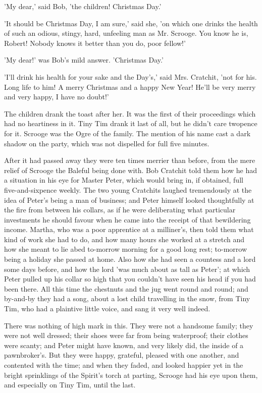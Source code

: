 'My dear,' said Bob, 'the children! Christmas Day.'

'It should be Christmas Day, I am sure,' said she, 'on which one drinks
the health of such an odious, stingy, hard, unfeeling man as Mr.
Scrooge. You know he is, Robert! Nobody knows it better than you do,
poor fellow!'

'My dear!' was Bob's mild answer. 'Christmas Day.'

'I'll drink his health for your sake and the Day's,' said Mrs. Cratchit,
'not for his. Long life to him! A merry Christmas and a happy New Year!
He'll be very merry and very happy, I have no doubt!'

The children drank the toast after her. It was the first of their
proceedings which had no heartiness in it. Tiny Tim drank it last of
all, but he didn't care twopence for it. Scrooge was the Ogre of the
family. The mention of his name cast a dark shadow on the party, which
was not dispelled for full five minutes.

After it had passed away they were ten times merrier than before, from
the mere relief of Scrooge the Baleful being done with. Bob Cratchit
told them how he had a situation in his eye for Master Peter, which
would bring in, if obtained, full five-and-sixpence weekly. The two
young Cratchits laughed tremendously at the idea of Peter's being a man
of business; and Peter himself looked thoughtfully at the fire from
between his collars, as if he were deliberating what particular
investments he should favour when he came into the receipt of that
bewildering income. Martha, who was a poor apprentice at a milliner's,
then told them what kind of work she had to do, and how many hours she
worked at a stretch and how she meant to lie abed to-morrow morning for
a good long rest; to-morrow being a holiday she passed at home. Also how
she had seen a countess and a lord some days before, and how the lord
'was much about as tall as Peter'; at which Peter pulled up his collar
so high that you couldn't have seen his head if you had been there. All
this time the chestnuts and the jug went round and round; and by-and-by
they had a song, about a lost child travelling in the snow, from Tiny
Tim, who had a plaintive little voice, and sang it very well indeed.

There was nothing of high mark in this. They were not a handsome family;
they were not well dressed; their shoes were far from being waterproof;
their clothes were scanty; and Peter might have known, and very likely
did, the inside of a pawnbroker's. But they were happy, grateful,
pleased with one another, and contented with the time; and when they
faded, and looked happier yet in the bright sprinklings of the Spirit's
torch at parting, Scrooge had his eye upon them, and especially on Tiny
Tim, until the last.

